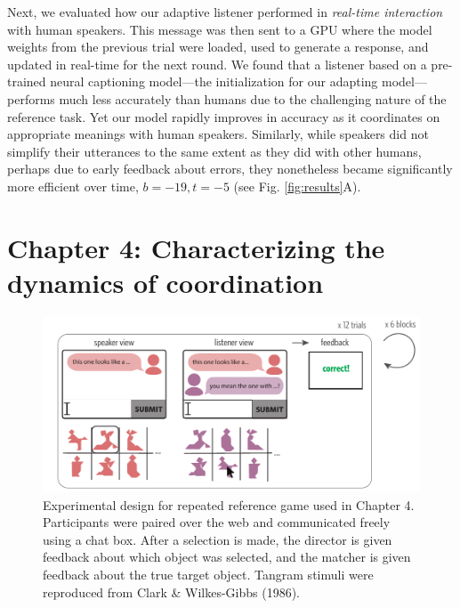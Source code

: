 \documentclass[11pt]{article}
\begin{document}
Next, we evaluated how our adaptive listener performed in \emph{real-time interaction} with human speakers. 
This message was then sent to a GPU where the model weights from the previous trial were loaded, used to generate a response, and updated in real-time for the next round.
We found that a listener based on a pre-trained neural captioning model---the initialization for our adapting model---performs much less accurately than humans due to the challenging nature of the reference task. 
Yet our model rapidly improves in accuracy as it coordinates on appropriate meanings with human speakers.
Similarly, while speakers did not simplify their utterances to the same extent as they did with other humans, perhaps due to early feedback about errors, they nonetheless became significantly more efficient over time, $b = -19, t = -5$ (see Fig. \ref{fig:results}A).




\section*{Chapter 4: Characterizing the dynamics of coordination} 

\begin{figure}[t!]
\centering
\includegraphics[scale=.93]{chapter4}
\caption{\small Experimental design for repeated reference game used in Chapter 4.  Participants were paired over the web and communicated freely using a chat box. After a selection is made, the director is given feedback about which object was selected, and the matcher is given feedback about the true target object. Tangram stimuli were reproduced from Clark \& Wilkes-Gibbs (1986).}
\label{fig:chapter4}
\end{figure}

\end{document}
